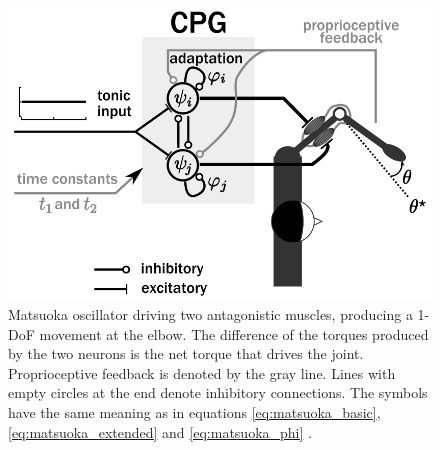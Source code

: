 \documentclass[12pt,twoside]{article}
\theoremstyle{plain}
\theoremstyle{definition}
\theoremstyle{remark}
\begin{document}
\begin{figure}[hbtp]
\centering
\includegraphics[scale=0.25]{figures/matsuoka_diagram.png}
\caption{Matsuoka oscillator driving two antagonistic muscles, producing a 1-DoF movement at the elbow. The difference of the torques produced by the two neurons is the net torque that drives the joint. Proprioceptive feedback is denoted by the gray line. Lines with empty circles at the end denote inhibitory connections. The symbols have the same meaning as in equations \ref{eq:matsuoka_basic}, \ref{eq:matsuoka_extended} and \ref{eq:matsuoka_phi} \cite{Ronsse2009}.}
\label{fig:matsuoka_diagram}
\end{figure}
\end{document}
